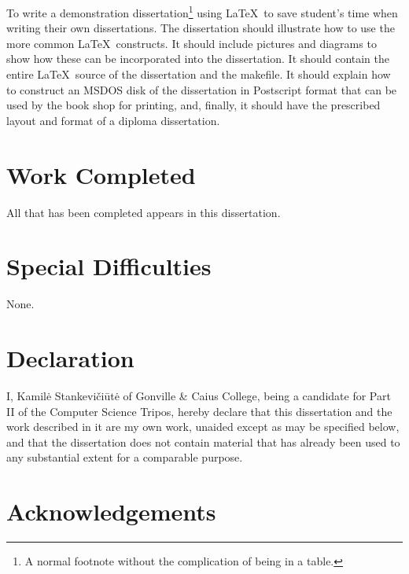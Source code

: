 \documentclass[12pt,a4paper,twoside, openright, hidelinks]{report}
\begin{document}
To write a demonstration dissertation\footnote{A normal footnote without the
complication of being in a table.} using \LaTeX\ to save
student's time when writing their own dissertations. The dissertation
should illustrate how to use the more common \LaTeX\ constructs. It
should include pictures and diagrams to show how these can be
incorporated into the dissertation.  It should contain the entire
\LaTeX\ source of the dissertation and the makefile.  It should
explain how to construct an MSDOS disk of the dissertation in
Postscript format that can be used by the book shop for printing, and,
finally, it should have the prescribed layout and format of a diploma
dissertation.


\section*{Work Completed}

All that has been completed appears in this dissertation.

\section*{Special Difficulties}

None.
 
\newpage
\section*{Declaration}

I, Kamilė Stankevičiūtė of Gonville \& Caius College, being a candidate for Part II of the Computer Science Tripos, hereby declare that this dissertation and the work described in it are my own work, unaided except as may be specified below, and that the dissertation does not contain material that has already been used to any substantial extent for a comparable purpose.

\bigskip
{}

\medskip
{}

\tableofcontents

\listoffigures

\newpage
\section*{Acknowledgements}

\pagestyle{headings}
\end{document}

